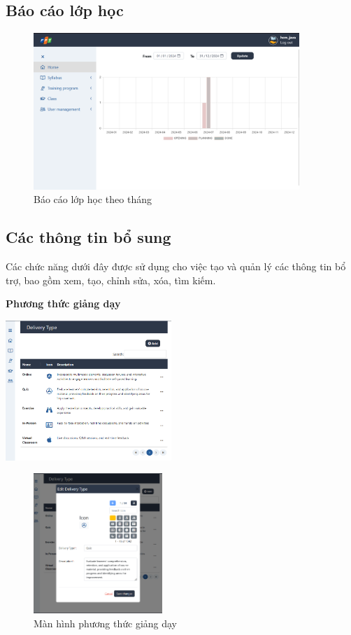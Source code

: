 \documentclass[report.tex]{subfiles}
\begin{document}
\subsection{Báo cáo lớp học}

\begin{figure}[!htb]
{\centering
\includegraphics[width=380px]{../meta/ui.class-chart.png}
\caption{Báo cáo lớp học theo tháng}
\par
}
\end{figure}
\FloatBarrier

\subsection{Các thông tin bổ sung}

Các chức năng dưới đây được sử dụng cho việc tạo và quản lý các thông tin bổ trợ,
bao gồm xem, tạo, chỉnh sửa, xóa, tìm kiếm.

\textbf{Phương thức giảng dạy}

{\centering
\includegraphics[height=200px]{../meta/ui.deli-list.png}
\par
}

\begin{figure}[!htb]
{\centering
\includegraphics[height=200px]{../meta/ui.deli-create.png}
\caption{Màn hình phương thức giảng dạy}
\par
}
\end{figure}
\FloatBarrier
\end{document}
